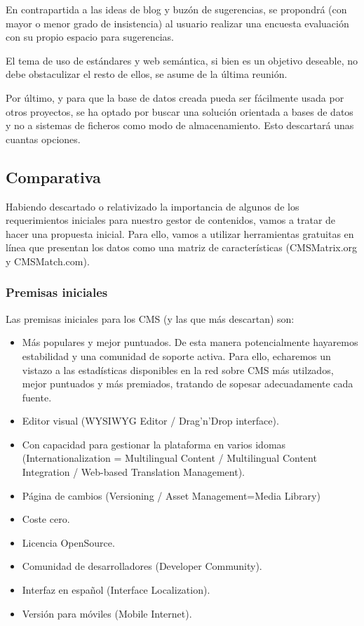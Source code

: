 \par En contrapartida a las ideas de blog y buzón de sugerencias, se propondrá (con mayor o menor grado de insistencia) al usuario realizar una encuesta evaluación con su propio espacio para sugerencias.

\par El tema de uso de estándares y web semántica, si bien es un objetivo deseable, no debe obstaculizar el resto de ellos, se asume de la última reunión.

\par Por último, y para que la base de datos creada pueda ser fácilmente usada por otros proyectos, se ha optado por buscar una solución orientada a bases de datos y no a sistemas de ficheros como modo de almacenamiento. Esto descartará unas cuantas opciones.

\subsection{Comparativa}

\par Habiendo descartado o relativizado la importancia de algunos de los requerimientos iniciales para nuestro gestor de contenidos, vamos a tratar de hacer una propuesta inicial. Para ello, vamos a utilizar herramientas gratuitas en línea que presentan los datos como una matriz de características (CMSMatrix.org y CMSMatch.com).

\subsubsection{Premisas iniciales}
\par Las premisas iniciales para los CMS (y las que más descartan) son:

\begin{itemize}
\item Más populares y mejor puntuados. De esta manera potencialmente hayaremos estabilidad y una comunidad de soporte activa. Para ello, echaremos un vistazo a las estadísticas disponibles en la red sobre CMS más utilzados, mejor puntuados y más premiados, tratando de sopesar adecuadamente cada fuente.
\item Editor visual (WYSIWYG Editor / Drag'n'Drop interface).
\item Con capacidad para gestionar la plataforma en varios idomas (Internationalization = Multilingual Content / Multilingual Content Integration / Web-based Translation Management).
\item Página de cambios (Versioning / Asset Management=Media Library)
\item Coste cero.
\item Licencia OpenSource.
\item Comunidad de desarrolladores (Developer Community).
\item Interfaz en español (Interface Localization).
\item Versión para móviles (Mobile Internet).
\end{itemize}

